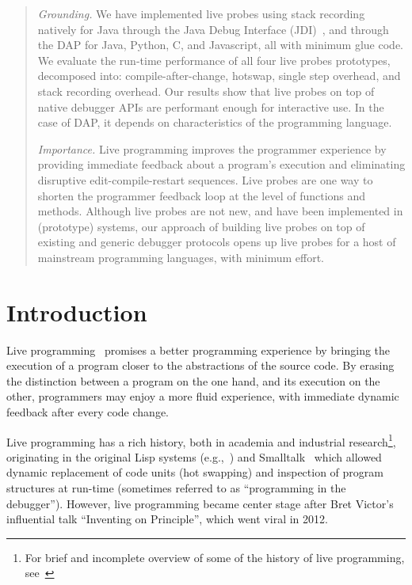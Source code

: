 \documentclass[english,submission]{programming}
\begin{document}
\begin{abstract}
  \textit{Grounding.}
  We have implemented live probes using stack recording natively for Java through the Java Debug Interface (JDI)~\cite{JDI}, and through the DAP for Java, Python, C, and Javascript, all with minimum glue code.  We evaluate the run-time performance of all four live probes prototypes, decomposed into: compile-after-change, hotswap, single step overhead, and stack recording overhead. Our results show that live probes on top of native debugger APIs are performant enough for interactive use. In the case of DAP, it depends on characteristics of the programming language. 

  \textit{Importance.} Live programming improves the programmer experience by providing immediate feedback about a program's execution and eliminating disruptive edit-compile-restart sequences. Live probes are one way to shorten the programmer feedback loop at the level of functions and methods. Although live probes are not new, and have been implemented in (prototype) systems, our approach of building live probes on top of existing and generic debugger protocols opens up live probes for a host of mainstream programming languages, with minimum effort.
\end{abstract}


\section{Introduction}
\label{sec:introduction}

Live programming~\cite{TanimotoLevels,UsableLiveProgramming,ExampleCentric,Hancock03} promises a better programming experience by bringing the execution of a program closer to the abstractions of the source code. By erasing the distinction between a program on the one hand, and its execution on the other, programmers may enjoy a more fluid experience, with immediate dynamic feedback after every code change. 

Live programming has a rich history, both in academia and industrial research\footnote{For brief and incomplete overview of some of the history of live programming, see~\cite{LiveProgHist13}}, originating in the original Lisp systems (e.g.,~\cite{Sandewall78,Masinter81}) and Smalltalk~\cite{Goldberg80} which allowed dynamic replacement of code units (hot swapping) and inspection of program structures at run-time (sometimes referred to as ``programming in the debugger''). However, live programming became center stage after Bret Victor's influential talk ``Inventing on Principle'', which went viral in 2012. 
\end{document}
